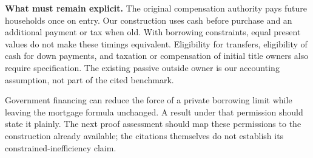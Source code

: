 \documentclass[11pt]{article}
\begin{document}
\textbf{What must remain explicit.} The original compensation authority pays
future households once on entry. Our construction uses cash before purchase
and an additional payment or tax when old. With borrowing constraints, equal
present values do not make these timings equivalent. Eligibility for transfers,
eligibility of cash for down payments, and taxation or compensation of initial
title owners also require specification. The existing passive outside owner
is our accounting assumption, not part of the cited benchmark.

Government financing can reduce the force of a private borrowing limit while
leaving the mortgage formula unchanged. A result under that permission should
state it plainly. The next proof assessment should map these permissions to
the construction already available; the citations themselves do not establish
its constrained-inefficiency claim.
\end{document}

